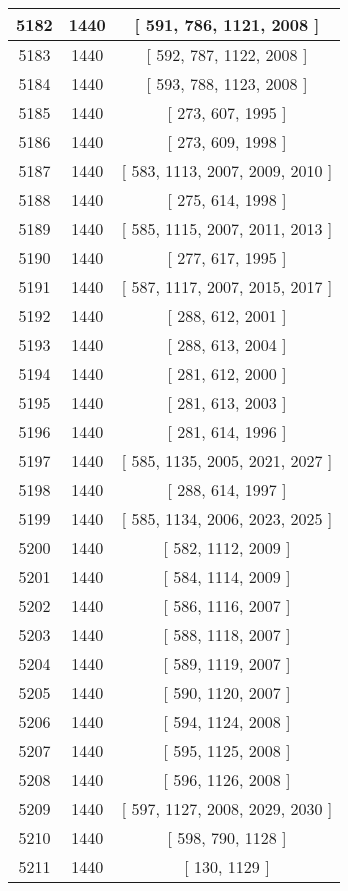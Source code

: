 \begin{center}
\begin{longtable}[H]{|| c c c ||}
\hline
5182 & 1440 & [ 591, 786, 1121, 2008 ] \\ 
\hline
5183 & 1440 & [ 592, 787, 1122, 2008 ] \\ 
\hline
5184 & 1440 & [ 593, 788, 1123, 2008 ] \\ 
\hline
5185 & 1440 & [ 273, 607, 1995 ] \\ 
\hline
5186 & 1440 & [ 273, 609, 1998 ] \\ 
\hline
5187 & 1440 & [ 583, 1113, 2007, 2009, 2010 ] \\ 
\hline
5188 & 1440 & [ 275, 614, 1998 ] \\ 
\hline
5189 & 1440 & [ 585, 1115, 2007, 2011, 2013 ] \\ 
\hline
5190 & 1440 & [ 277, 617, 1995 ] \\ 
\hline
5191 & 1440 & [ 587, 1117, 2007, 2015, 2017 ] \\ 
\hline
5192 & 1440 & [ 288, 612, 2001 ] \\ 
\hline
5193 & 1440 & [ 288, 613, 2004 ] \\ 
\hline
5194 & 1440 & [ 281, 612, 2000 ] \\ 
\hline
5195 & 1440 & [ 281, 613, 2003 ] \\ 
\hline
5196 & 1440 & [ 281, 614, 1996 ] \\ 
\hline
5197 & 1440 & [ 585, 1135, 2005, 2021, 2027 ] \\ 
\hline
5198 & 1440 & [ 288, 614, 1997 ] \\ 
\hline
5199 & 1440 & [ 585, 1134, 2006, 2023, 2025 ] \\ 
\hline
5200 & 1440 & [ 582, 1112, 2009 ] \\ 
\hline
5201 & 1440 & [ 584, 1114, 2009 ] \\ 
\hline
5202 & 1440 & [ 586, 1116, 2007 ] \\ 
\hline
5203 & 1440 & [ 588, 1118, 2007 ] \\ 
\hline
5204 & 1440 & [ 589, 1119, 2007 ] \\ 
\hline
5205 & 1440 & [ 590, 1120, 2007 ] \\ 
\hline
5206 & 1440 & [ 594, 1124, 2008 ] \\ 
\hline
5207 & 1440 & [ 595, 1125, 2008 ] \\ 
\hline
5208 & 1440 & [ 596, 1126, 2008 ] \\ 
\hline
5209 & 1440 & [ 597, 1127, 2008, 2029, 2030 ] \\ 
\hline
5210 & 1440 & [ 598, 790, 1128 ] \\ 
\hline
5211 & 1440 & [ 130, 1129 ] \\ 

\end{longtable}
\end{center}
